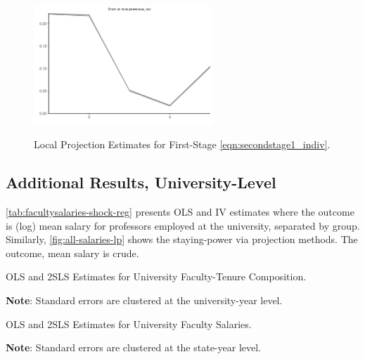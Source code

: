 \documentclass[notitlepage,12pt]{article}
\begin{document}
\begin{figure}[h!]
    \centering
    \caption{Local Projection Estimates for First-Stage \autoref{eqn:secondstage1_indiv}.}
    \includegraphics[width=0.6\textwidth]{figures/firststage-illinois-lp.png}
    \label{fig:firststage-illinois-lp}
\end{figure}


\subsection{Additional Results, University-Level}

\autoref{tab:facultysalaries-shock-reg} presents OLS and IV estimates where the outcome is (log) mean salary for professors employed at the university, separated by group.
Similarly, \autoref{fig:all-salaries-lp} shows the staying-power via projection methods.
The outcome, mean salary is crude.

\begin{table}[H]
    \onehalfspacing
    \centering
    \caption{OLS and 2SLS Estimates for University Faculty-Tenure Composition.}
    \makebox[\textwidth][c]{}
    \begin{flushleft}
        \footnotesize
        \textbf{Note}: Standard errors are clustered at the university-year level.
    \end{flushleft}
    \label{tab:tenurecount-shock-reg-fte}
\end{table}

\begin{table}[H]
    \onehalfspacing
    \centering
    \caption{OLS and 2SLS Estimates for University Faculty Salaries.}
    \makebox[\textwidth][c]{}
    \begin{flushleft}
        \footnotesize
        \textbf{Note}: Standard errors are clustered at the state-year level.
    \end{flushleft}
    \label{tab:facultysalaries-shock-reg}
\end{table}
\end{document}
